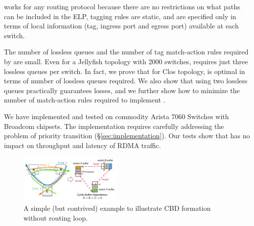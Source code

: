 \sysname{} works for any routing protocol because there are no restrictions on
what paths can be included in the ELP, tagging rules are static, and are
specified only in terms of local information (tag, ingress port and egress port)
available at each switch.

The number of lossless queues and the number of tag match-action rules required
by \sysname{} are small.  Even for a Jellyfish topology with 2000 switches,
\sysname{} requires just three lossless queues per switch.  In fact, we prove
that for Clos topology,  \sysname{} is optimal in terms of number of lossless
queues required. We also show that using two lossless queues practically guarantees losses, and we further show how to minimize the number of match-action rules
required to implement \sysname{}.

We have implemented and tested \sysname{} on commodity Arista 7060 Switches with
Broadcom chipsets. The implementation requires carefully addressing the problem
of priority transition (\S\ref{sec:implementation}). Our tests show that
\sysname{} has no impact on throughput and latency of RDMA traffic.

\begin{figure}[t]
		\centering
		\includegraphics[width=0.45\textwidth] {figs/deadlock}
		\vspace{-1em}
		\caption{A simple (but contrived) example to illustrate CBD formation
		without routing loop.}
		\vspace{-1em}
		\label{fig:basic_deadlock}
\end{figure}
